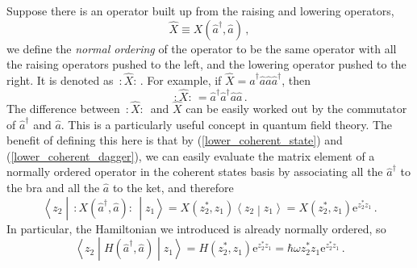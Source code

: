 \documentclass{article}
\theoremstyle{plain}\theoremheaderfont{\normalfont\itshape}\theorembodyfont{\rmfamily}\theoremseparator{.}\newtheorem*{rem}{Remark}\newtheorem*{ex}{Example}\newtheorem*{proof}{Proof}\newtheorem*{altp}{Alternative proof}
\theoremstyle{plain}\theoremheaderfont{\normalfont\bfseries}\theorembodyfont{\rmfamily}\theoremseparator{.}\newtheorem{thm}{Theorem}[section]\newtheorem{lem}[thm]{Lemma}\newtheorem{prop}[thm]{Proposition}\newtheorem*{cor}{Corollary}\newtheorem{defn}[thm]{Definition}\newtheorem{clm}[thm]{Claim}\newtheorem{clminproof}{Claim}
\theoremstyle{break}\theoremheaderfont{\normalfont\itshape}\theorembodyfont{\rmfamily}\theoremseparator{.\medskip}\newtheorem*{proofskip}{Proof}\newtheorem*{exs}{Examples}\newtheorem*{rems}{Remarks}
\theoremstyle{break}\theoremheaderfont{\normalfont\bfseries}\theorembodyfont{\rmfamily}\theoremseparator{.\medskip}\newtheorem{lemskip}[thm]{Lemma}\newtheorem{defnskip}[thm]{Definition}\newtheorem{propskip}[thm]{Proposition}\newtheorem{thmskip}[thm]{Theorem}
\numberwithin{equation}{section}
\newcommand{\ee}{\mathrm{e}}
\newcommand{\braket}[2]{\left\langle #1 \middle| #2 \right\rangle}
\newcommand{\mel}[3]{\left\langle #1 \middle| #2 \middle| #3 \right\rangle}
\newcommand{\rai}{\hat{a}^\dagger}
\newcommand{\low}{\hat{a}}
\newcommand{\nord}[1]{\,:#1:\,}
\begin{document}
    Suppose there is an operator built up from the raising and lowering operators,
    \begin{equation}
        \hat{X}\equiv X(\rai,\low)\,,
    \end{equation}
    we define the \textit{normal ordering} of the operator to be the same operator with all the raising operators pushed to the left, and the lowering operator pushed to the right. It is denoted as \(\nord{\hat{X}}\). For example, if \(\hat{X}=\rai\low\low\rai\), then
    \begin{equation}
        \nord{\hat{X}}=\rai\rai\low\low\,.
    \end{equation}
    The difference between \(\nord{\hat{X}}\) and \(\hat{X}\) can be easily worked out by the commutator of \(\rai\) and \(\low\). This is a particularly useful concept in quantum field theory. The benefit of defining this here is that by (\ref{lower_coherent_state}) and (\ref{lower_coherent_dagger}), we can easily evaluate the matrix element of a normally ordered operator in the coherent states basis by associating all the \(\rai\) to the bra and all the \(\low\) to the ket, and therefore
    \begin{equation}
        \mel{z_2}{\nord{X(\rai,\low)}}{z_1}=X(z_2^*,z_1)\braket{z_2}{z_1}=X(z_2^*,z_1)\ee^{z_2^* z_1}\,.
    \end{equation}
    In particular, the Hamiltonian we introduced is already normally ordered, so
    \begin{equation}
        \mel{z_2}{H(\rai,\low)}{z_1}=H(z_2^*,z_1)\ee^{z_2^* z_1}=\hbar\omega z_2^* z_1\ee^{z_2^* z_1}\,.
    \end{equation}
\end{document}
